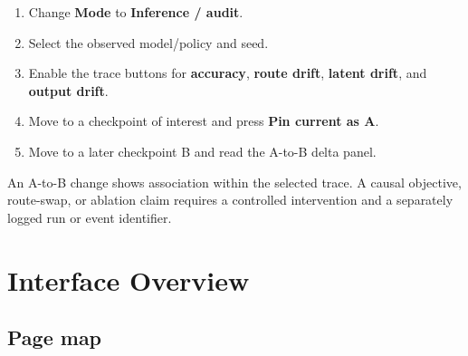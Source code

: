 \documentclass[11pt,a4paper]{article}
\newcommand{\ui}[1]{\textsf{\bfseries #1}}
\begin{document}
\begin{enumerate}
  \item Change \ui{Mode} to \ui{Inference / audit}.
  \item Select the observed model/policy and seed.
  \item Enable the trace buttons for \ui{accuracy}, \ui{route drift}, \ui{latent drift}, and \ui{output drift}.
  \item Move to a checkpoint of interest and press \ui{Pin current as A}.
  \item Move to a later checkpoint B and read the A-to-B delta panel.
\end{enumerate}

\begin{warningbox}
An A-to-B change shows association within the selected trace. A causal objective, route-swap, or ablation claim requires a controlled intervention and a separately logged run or event identifier.
\end{warningbox}

\clearpage
\section{Interface Overview}

\subsection{Page map}
\end{document}
